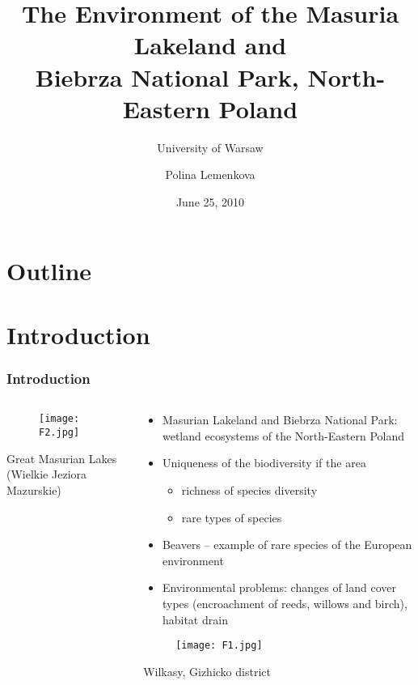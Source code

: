 \documentclass[pdflatex,compress,8pt,
	xcolor={dvipsnames,dvipsnames,svgnames,x11names,table},
	hyperref={colorlinks = true,
	breaklinks = true, urlcolor = NavyBlue, breaklinks = true}]{beamer}
\title{The Environment of the Masuria Lakeland and\\ Biebrza National Park, North-Eastern Poland}
\subtitle{University of Warsaw}
\institute{Presentation at GEM MSc Course, Erasmus Mundus Scholarship}
\author{Polina Lemenkova}
\date{June 25, 2010}
\begin{document}
\begin{frame}
           \titlepage
\end{frame}

\section*{Outline}
        \begin{frame}
           \tableofcontents
         \end{frame}

\section{Introduction}
\begin{frame}\frametitle{Introduction}
\begin{minipage}[0.4\textheight]{\textwidth}
\begin{columns}[T]
\begin{column}{0.5\textwidth}
\vspace{2em}
\begin{figure}[H]
	\centering
		\texttt{[image: F2.jpg]}
\end{figure}
\footnotesize{Great Masurian Lakes (Wielkie Jeziora Mazurskie)}
\end{column}
\begin{column}{0.6\textwidth}
\vspace{2em} 
\begin{itemize}
	\item Masurian Lakeland and Biebrza National Park: wetland ecosystems of the North-Eastern Poland
	\item Uniqueness of the biodiversity if the area 
	\begin{itemize}
		\item richness of species diversity
		\item rare types of species
	\end{itemize}
	\item Beavers – example of rare species of the European environment
	\item Environmental problems: changes of land cover types (encroachment of reeds, willows and birch), habitat drain\end{itemize}
	\begin{figure}[H]
		\texttt{[image: F1.jpg]}
	\end{figure}
	\footnotesize{Wilkasy, Gizhicko district}
\end{column}
\end{columns}
\end{minipage}
\end{frame}
\end{document}
